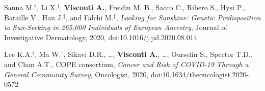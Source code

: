 \documentclass[a4paper,10pt]{article}
\begin{document}
{\begin{itemize}
		 Sanna M.$^{\textbf{$\dag $}}$, Li X.$^{\textbf{$\dag $}}$, \textbf{Visconti A.}, Freidin M. B., Sacco C., Ribero S., Hysi P., Bataille V., Han J.$^{\textbf{$\ddag $}}$, and Falchi M.$^{\textbf{$\ddag $}}$, \emph{Looking for Sunshine: Genetic Predisposition to Sun-Seeking in 265,000 Individuals of European Ancestry}, Journal of Investigative Dermatology, 2020, doi:10.1016/j.jid.2020.08.014

		 Lee K.A.$^{\textbf{$\dag $}}$, Ma W.$^{\textbf{$\dag $}}$, Sikavi D.R., \dots, \textbf{Visconti A.}, \dots, Ourselin S., Spector T.D., and Chan A.T., COPE consortium, \emph{Cancer and Risk of COVID-19 Through a General Community Survey}, Oncologist, 2020, doi:10.1634/theoncologist.2020-0572

	\end{itemize}
}
\end{document}
